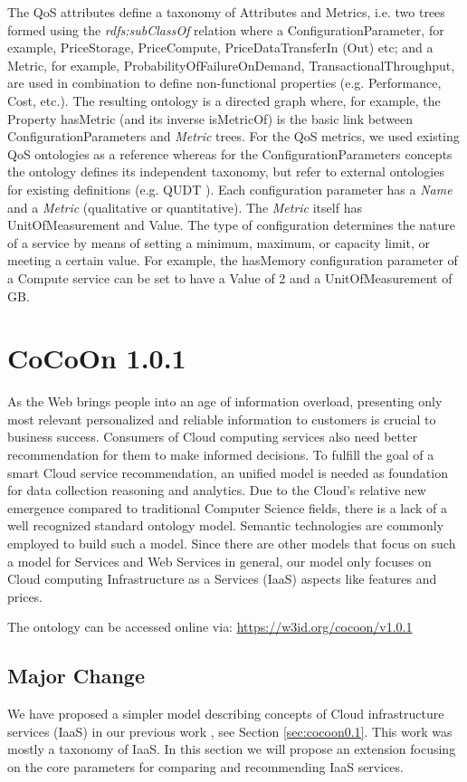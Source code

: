 The QoS attributes define a taxonomy of Attributes and Metrics,
i.e. two trees formed using the \textit{rdfs:subClassOf} relation where
a ConfigurationParameter, for example, PriceStorage, PriceCompute, PriceDataTransferIn (Out) etc;
and a Metric, for example, ProbabilityOfFailureOnDemand, TransactionalThroughput, are used in combination to
define non-functional properties (e.g. Performance, Cost, etc.). The resulting ontology is a directed graph where, for example,
the Property hasMetric (and its inverse isMetricOf) is the basic link between ConfigurationParameters and \textit{Metric} trees. For the
QoS metrics, we used existing QoS ontologies \cite{QoSOnt} as a reference whereas
for the ConfigurationParameters concepts the ontology defines its independent taxonomy, but refer to external ontologies for existing definitions
(e.g. QUDT \cite{QUDT}). Each configuration
parameter has a \textit{Name} and a \textit{Metric} (qualitative or quantitative).
The \textit{Metric} itself has UnitOfMeasurement and Value. The type of configuration determines the nature of a service by means of setting a minimum, maximum, or capacity limit, or meeting a certain value. For example, the hasMemory configuration parameter
of a Compute service can be set to have a Value of 2 and a UnitOfMeasurement of GB.

\section{CoCoOn 1.0.1}
\label{sec:cocoon1.0.1}
As the Web brings people into an age of information overload,
presenting only most relevant personalized and reliable
information to customers is crucial to business success.
Consumers of Cloud computing services also need better recommendation
for them to make informed decisions.
To fulfill the goal of a smart Cloud service recommendation,
an unified model is needed as foundation for data collection reasoning and analytics.
Due to the Cloud's relative new emergence compared to traditional Computer Science fields, there is a lack of a well recognized standard ontology model.
Semantic technologies are commonly employed to build such a model.
Since there are other models that focus on such a model for Services and Web Services in general, our model only focuses on Cloud computing Infrastructure as a Services (IaaS) aspects like features and prices.

The ontology can be accessed online via:
\url{https://w3id.org/cocoon/v1.0.1}

\subsection{Major Change}
We have proposed a simpler model describing concepts of Cloud infrastructure services (IaaS)
in our previous work \cite{IJNGC2013,CoCoOn2012},
see Section \ref{sec:cocoon0.1}. This work was mostly a taxonomy of IaaS.
In this section we will propose an extension focusing on the core parameters for comparing and recommending IaaS services.

